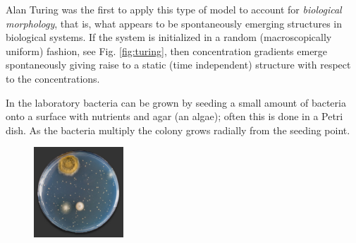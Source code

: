 \begin{example}
	Alan Turing was the first to apply this type of model to account for
	\emph{biological morphology}, that is, what appears to be spontaneously emerging
	structures in biological systems. If the system is initialized in a random 
	(macroscopically uniform) fashion, see Fig. \ref{fig:turing}, then
	concentration gradients emerge spontaneously giving raise to a static (time independent) 
	structure with respect to the concentrations.
\end{example}

\begin{example}
	\label{ex:bacteria-in-dish}
	In the laboratory bacteria can be grown by seeding a small amount of bacteria onto 
	a surface with nutrients and agar (an algae); often this is done in a Petri dish. As the 
	bacteria multiply the colony grows radially from the seeding point.   
	\begin{figure}
		\centering
		\includegraphics[width=0.3\textwidth]{figs/petri-dish-bacteria-growth.jpg}
		\caption*{}
	\end{figure}

\end{example}
